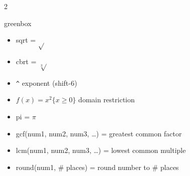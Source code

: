 \documentclass[10pt]{article}
\begin{document}
\begin{multicols}{2}
        \begin{skillbox}{greenbox}
            \begin{itemize}
                \item sqrt = $\sqrt{}$
                \item cbrt = $\sqrt[3]{}$
                \item \texttt{\textasciicircum} exponent (shift-6)
                \item $f(x) = x^2 \{x \ge 0\}$ domain restriction
                \item pi = $\pi$
                \item gcf(num1, num2, num3, \ldots) = greatest common factor
                \item lcm(num1, num2, num3, \ldots) = lowest common multiple
                \item round(num1, \# places) = round number to \# places
            \end{itemize}
        \end{skillbox}
    \end{multicols}
\end{document}
